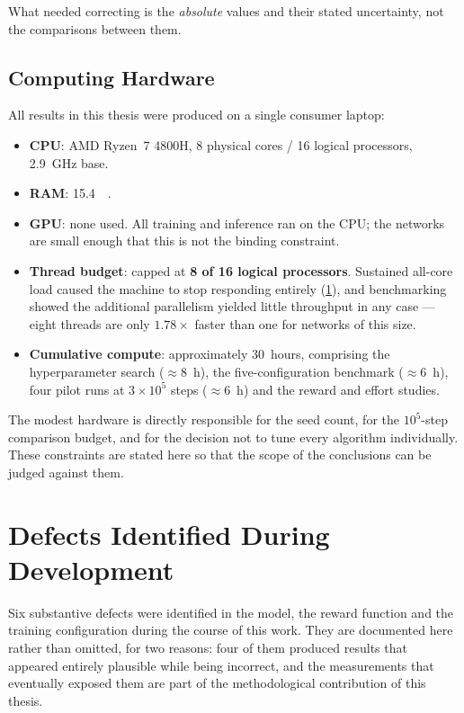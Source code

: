 What needed correcting is the \emph{absolute} values and their stated
uncertainty, not the comparisons between them.

\subsection{Computing Hardware}

All results in this thesis were produced on a single consumer laptop:

\begin{itemize}
  \item \textbf{CPU}: AMD Ryzen~7 4800H, 8 physical cores / 16 logical
        processors, \SI{2.9}{\giga\hertz} base.
  \item \textbf{RAM}: \SI{15.4}{\giga\byte}.
  \item \textbf{GPU}: none used. All training and inference ran on the CPU;
        the networks are small enough that this is not the binding constraint.
  \item \textbf{Thread budget}: capped at \textbf{8 of 16 logical processors}.
        Sustained all-core load caused the machine to stop responding entirely
        (\cref{sec:defects}), and benchmarking showed the additional parallelism
        yielded little throughput in any case --- eight threads are only
        $1.78\times$ faster than one for networks of this size.
  \item \textbf{Cumulative compute}: approximately 30~hours, comprising the
        hyperparameter search ($\approx 8$~h), the five-configuration benchmark
        ($\approx 6$~h), four pilot runs at $3 \times 10^5$ steps
        ($\approx 6$~h) and the reward and effort studies.
\end{itemize}

The modest hardware is directly responsible for the seed count, for the
$10^5$-step comparison budget, and for the decision not to tune every algorithm
individually. These constraints are stated here so that the scope of the
conclusions can be judged against them.

\section{Defects Identified During Development}
\label{sec:defects}

Six substantive defects were identified in the model, the reward function and the
training configuration during the course of this work. They are documented here
rather than omitted, for two reasons: four of them produced results that appeared
entirely plausible while being incorrect, and the measurements that eventually
exposed them are part of the methodological contribution of this thesis.


